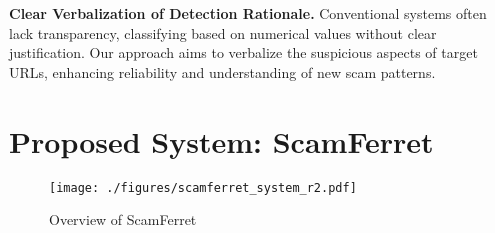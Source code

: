 \documentclass[runningheads]{llncs}
\begin{document}
\noindent\textbf{Clear Verbalization of Detection Rationale.}
Conventional systems often lack transparency, classifying based on numerical values without clear justification.
Our approach aims to verbalize the suspicious aspects of target URLs, enhancing reliability and understanding of new scam patterns.

\section{Proposed System: ScamFerret}

\begin{figure}[!t]
    \centering
        \texttt{[image: ./figures/scamferret\_system\_r2.pdf]}
        \caption{Overview of ScamFerret}
        \label{fig:proposed_system}
\end{figure}
\end{document}
